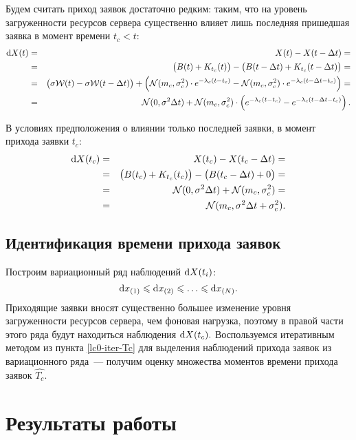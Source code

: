 \documentclass[a4paper,10pt]{article}
\begin{document}
Будем считать приход заявок достаточно редким: таким, что на уровень
загруженности ресурсов сервера существенно влияет лишь последняя пришедшая 
заявка в момент времени $t_c < t$:
\begin{eqnarray*}
\dif X(t) 
  & = & X(t) - X(t - \Delta t) = \\
  & = & \del{B(t) + K_{t_c}(t)} - 
      \del{B(t - \Delta t) + K_{t_c}(t - \Delta t)} = \\
  & = & \del{\sigma \mathcal{W}(t) - \sigma \mathcal{W}(t - \Delta t)} +
      \del{\mathcal{N}(m_c, \sigma_c^2) \cdot e^{-\lambda_c(t - t_c)} - 
           \mathcal{N}(m_c, \sigma_c^2) \cdot 
              e^{-\lambda_c(t - \Delta t - t_c)}} = \\
  & = & \mathcal{N}(0, \sigma^2 \Delta t) + 
      \mathcal{N}(m_c, \sigma_c^2) \cdot 
        \del{e^{-\lambda_c(t - t_c)} - e^{-\lambda_c(t - \Delta t - t_c)}}.
\end{eqnarray*}

В условиях предположения о влиянии только последней заявки, 
в момент прихода заявки $t_c$:
\begin{eqnarray*}
\dif X(t_c) 
  & = & X(t_c) - X(t_c - \Delta t) = \\
  & = & \del{B(t_c) + K_{t_c}(t_c)} - 
      \del{B(t_c - \Delta t) + 0} = \\
  & = & \mathcal{N}(0, \sigma^2 \Delta t) + 
      \mathcal{N}(m_c, \sigma_c^2) = \\
  & = & \mathcal{N}(m_c, \sigma^2 \Delta t + \sigma_c^2).
\end{eqnarray*}

\subsection{Идентификация времени прихода заявок}
Построим вариационный ряд наблюдений $\dif X(t_i)$:
$$\dif x_{(1)} \leqslant \dif x_{(2)} \leqslant \ldots 
  \leqslant \dif x_{(N)}.$$
Приходящие заявки вносят существенно большее изменение уровня загруженности
ресурсов сервера, чем фоновая нагрузка, 
поэтому в правой части этого ряда будут находиться наблюдения 
$\dif X(t_c).$
Воспользуемся итеративным методом из пункта \ref{lc0-iter-Tc} для выделения
наблюдений прихода заявок из вариационного ряда~--- 
получим оценку множества моментов времени прихода заявок $\widehat{T_c}$.

\section{Результаты работы}




\pagebreak



\end{document}
